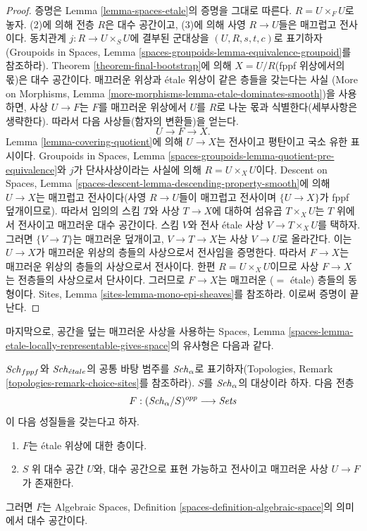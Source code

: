 \begin{proof}
증명은 Lemma \ref{lemma-spaces-etale}의 증명을 그대로 따른다.
$R = U \times_F U$로 놓자. (2)에 의해 전층 $R$은 대수 공간이고,
(3)에 의해 사영 $R \to U$들은 매끄럽고 전사이다.
동치관계 $j : R \to U \times_S U$에 결부된 군대상을
$(U, R, s, t, c)$로 표기하자(Groupoids in Spaces, Lemma
\ref{spaces-groupoids-lemma-equivalence-groupoid}를 참조하라).
Theorem \ref{theorem-final-bootstrap}에 의해
$X = U/R$(fppf 위상에서의 몫)은 대수 공간이다.
매끄러운 위상과 \'etale 위상이 같은 층들을 갖는다는 사실
(More on Morphisms, Lemma
\ref{more-morphisms-lemma-etale-dominates-smooth})을 사용하면,
사상 $U \to F$는 $F$를 매끄러운 위상에서 $U$를 $R$로 나눈
몫과 식별한다(세부사항은 생략한다).
따라서 다음 사상들(함자의 변환들)을 얻는다.
$$
U \to F \to X.
$$
Lemma \ref{lemma-covering-quotient}에 의해 $U \to X$는
전사이고 평탄이고 국소 유한 표시이다.
Groupoids in Spaces, Lemma
\ref{spaces-groupoids-lemma-quotient-pre-equivalence}와
$j$가 단사사상이라는 사실에 의해 $R = U \times_X U$이다.
Descent on Spaces, Lemma
\ref{spaces-descent-lemma-descending-property-smooth}에 의해
$U \to X$는 매끄럽고 전사이다(사영 $R \to U$들이 매끄럽고
전사이며 $\{U \to X\}$가 fppf 덮개이므로).
따라서 임의의 스킴 $T$와 사상 $T \to X$에 대하여
섬유곱 $T \times_X U$는 $T$ 위에서 전사이고 매끄러운 대수 공간이다.
스킴 $V$와 전사 \'etale 사상 $V \to T \times_X U$를 택하자.
그러면 $\{V \to T\}$는 매끄러운 덮개이고,
$V \to T \to X$는 사상 $V \to U$로 올라간다.
이는 $U \to X$가 매끄러운 위상의 층들의 사상으로서 전사임을
증명한다. 따라서 $F \to X$는 매끄러운 위상의 층들의 사상으로서
전사이다. 한편 $R = U \times_X U$이므로 사상 $F \to X$는
전층들의 사상으로서 단사이다.
그러므로 $F \to X$는 매끄러운 ($=$ \'etale) 층들의 동형이다.
Sites, Lemma \ref{sites-lemma-mono-epi-sheaves}를 참조하라.
이로써 증명이 끝난다.
\end{proof}

\noindent
마지막으로, 공간을 덮는 매끄러운 사상을 사용하는
Spaces, Lemma
\ref{spaces-lemma-etale-locally-representable-gives-space}의
유사형은 다음과 같다.

\begin{lemma}
\label{lemma-spaces-smooth-locally-representable}
$\mathit{Sch}_{fppf}$와 $\mathit{Sch}_{\acute{e}tale}$의 공통 바탕 범주를
$\mathit{Sch}_\alpha$로 표기하자(Topologies, Remark
\ref{topologies-remark-choice-sites}를 참조하라).
$S$를 $\mathit{Sch}_\alpha$의 대상이라 하자. 다음 전층
$$
F : (\mathit{Sch}_\alpha/S)^{opp} \longrightarrow \textit{Sets}
$$
이 다음 성질들을 갖는다고 하자.
\begin{enumerate}
\item $F$는 \'etale 위상에 대한 층이다.
\item $S$ 위 대수 공간 $U$와, 대수 공간으로 표현 가능하고
전사이고 매끄러운 사상 $U \to F$가 존재한다.
\end{enumerate}
그러면 $F$는 Algebraic Spaces, Definition
\ref{spaces-definition-algebraic-space}의 의미에서 대수 공간이다.
\end{lemma}

